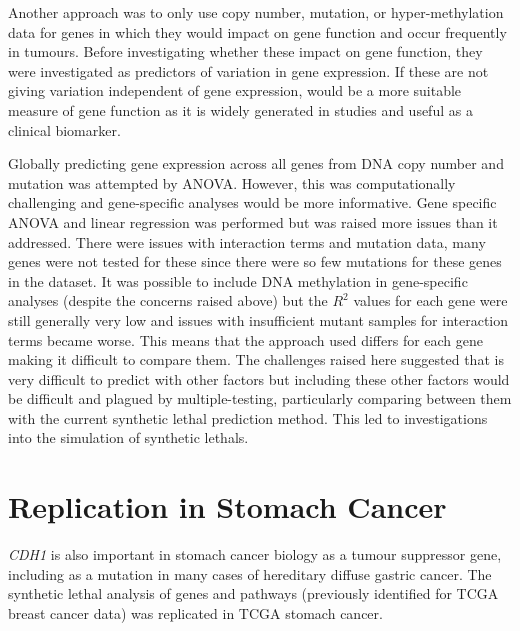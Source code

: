 Another approach was to only use copy number, \gls{mutation}, or hyper-methylation data for genes in which they would impact on gene function and occur frequently in tumours. Before investigating whether these impact on gene function, they were investigated as predictors of variation in \gls{gene expression}. If these are not giving variation independent of \gls{gene expression},  would be a more suitable measure of gene function as it is widely generated in studies and useful as a clinical biomarker.

Globally predicting \gls{gene expression} across all genes from \acrshort{DNA} copy number and  \gls{mutation} was attempted by \gls{ANOVA}. However, this was computationally challenging and gene-specific analyses would be more informative. Gene specific \gls{ANOVA} and linear regression was performed but was raised more issues than it addressed. There were issues with interaction terms and \gls{mutation} data, many genes were not tested for these since there were so few \glspl{mutation} for these genes in the dataset.  It was possible to include \acrshort{DNA} methylation in gene-specific analyses (despite the concerns raised above) but the $R^2$ values for each gene were still generally very low and issues with insufficient \gls{mutant} samples for interaction terms became worse. This means that the approach used differs for each gene making it difficult to compare them. The challenges raised here suggested that  is very difficult to predict with other factors but including these other factors would be difficult and plagued by multiple-testing, particularly comparing between them with the current \gls{synthetic lethal} prediction method. This led to investigations into the simulation of \glspl{synthetic lethal}.
\fi

\FloatBarrier

\section{Replication in Stomach Cancer} \label{chapt3:stad_replication}

\textit{CDH1} is also important in stomach cancer biology as a  \gls{tumour suppressor} gene, including as a  \gls{mutation} in many cases of \gls{hereditary} diffuse gastric cancer. The \gls{synthetic lethal} analysis of genes and \glspl{pathway} (previously identified for \gls{TCGA} breast cancer data) was replicated in \gls{TCGA} stomach cancer. %

